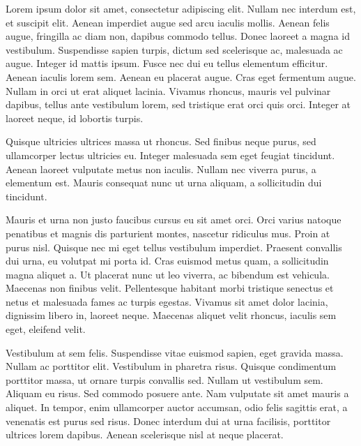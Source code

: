 \documentclass[17pt]{extarticle}
\begin{document}

Lorem ipsum dolor sit amet, {\color{red}consectetur adipiscing} elit. Nullam nec interdum est, et suscipit elit. Aenean imperdiet augue sed arcu iaculis mollis. Aenean felis augue, fringilla ac diam non, dapibus commodo tellus. {\color{red}Donec} laoreet a magna id vestibulum. Suspendisse sapien turpis, dictum sed scelerisque ac, malesuada ac augue. Integer id mattis ipsum. Fusce nec dui eu tellus elementum efficitur. {\color{red}Aenean} iaculis lorem sem. {\color{red}Aenean eu placerat augue}. Cras eget fermentum augue. Nullam in orci ut erat aliquet lacinia. Vivamus rhoncus, mauris vel pulvinar dapibus, tellus ante vestibulum lorem, sed {\color{red}tristique erat orci} quis orci. Integer at laoreet neque, id lobortis turpis.

Quisque ultricies ultrices massa ut rhoncus. Sed finibus neque purus, sed ullamcorper lectus ultricies eu. Integer malesuada sem eget feugiat tincidunt. {\color{red}Aenean} laoreet vulputate metus non iaculis. Nullam nec viverra purus, a elementum est. Mauris consequat nunc ut urna aliquam, a sollicitudin dui tincidunt.

Mauris et urna non justo faucibus cursus eu sit amet orci. Orci varius natoque penatibus et magnis dis parturient montes, nascetur ridiculus mus. Proin at purus nisl. {\color{red}Quisque nec mi eget tellus vestibulum imperdiet. Praesent convallis dui urna, eu volutpat mi porta id. Cras euismod metus quam, a sollicitudin magna aliquet a. Ut placerat nunc ut leo viverra, ac bibendum est vehicula. Maecenas non finibus velit.} Pellentesque habitant morbi tristique senectus et netus et malesuada fames ac turpis egestas. Vivamus sit amet dolor lacinia, dignissim libero in, laoreet neque. Maecenas aliquet velit rhoncus, iaculis sem eget, eleifend velit.

Vestibulum at sem felis. Suspendisse vitae euismod sapien, eget gravida massa. {\color{red}Nullam} ac porttitor elit. Vestibulum in pharetra risus. Quisque condimentum porttitor massa, ut ornare turpis convallis sed. {\color{red}Nullam ut vestibulum sem. Aliquam eu risus. Sed commodo posuere ante.} Nam vulputate sit amet mauris a aliquet. In tempor, enim ullamcorper auctor accumsan, odio felis {\color{red}sagittis} erat, a venenatis est purus sed risus. Donec interdum dui at urna facilisis, porttitor ultrices lorem dapibus. Aenean scelerisque nisl at neque placerat.
\end{document}

